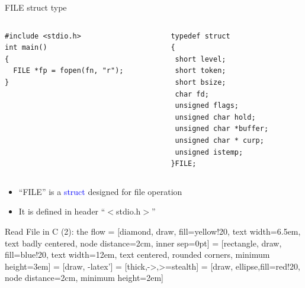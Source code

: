 \begin{frame}[fragile]{FILE struct type}
\vspace{-0.15in}
\begin{columns}
\begin{column}{0.47\linewidth}
\begin{lstlisting}
#include <stdio.h>
int main()
{
  FILE *fp = fopen(fn, "r");
}
\end{lstlisting}
\end{column}
\begin{column}{0.49\linewidth}
\begin{lstlisting}[xleftmargin=0.1\linewidth, linewidth=0.90\linewidth]
typedef struct 
{
 short level;
 short token;
 short bsize;
 char fd;
 unsigned flags;
 unsigned char hold;
 unsigned char *buffer;
 unsigned char * curp;
 unsigned istemp; 
}FILE;
\end{lstlisting}
\end{column}
\end{columns}
\vspace{-0.2in}
\begin{itemize}
	\item {``FILE'' is a \textcolor{blue}{struct} designed for file operation}
	\item {It is defined in header ``$<$stdio.h$>$''}
\end{itemize}
\end{frame}


\begin{frame}[fragile]{Read File in C (2): the flow}
 = [diamond, draw, fill=yellow!20, 
    text width=6.5em, text badly centered, node distance=2cm, inner sep=0pt]
 = [rectangle, draw, fill=blue!20, 
    text width=12em, text centered, rounded corners, minimum height=3em]
 = [draw, -latex']
 = [thick,->,>=stealth]
 = [draw, ellipse,fill=red!20, node distance=2cm,
    minimum height=2em]
\begin{center}


\end{center}
\end{frame}

